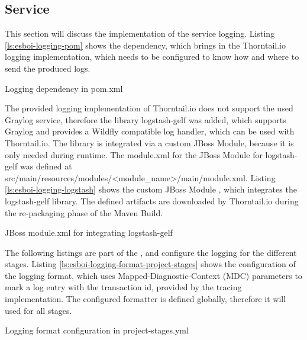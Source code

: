 \subsection{Service}
\label{sec:esbi-logging-service}
This section will discuss the implementation of the service logging. Listing \vref{ls:esboi-logging-pom} shows the dependency, which brings in the Thorntail.io logging implementation, which needs to be configured to know how and where to send the produced logs.

\begin{listing}[h]
	\caption{Logging dependency in pom.xml}
	\label{ls:esboi-logging-pom}
\end{listing}

The provided logging implementation of Thorntail.io does not support the used Graylog service, therefore the library logstash-gelf was added, which supports Graylog and provides a Wildfly compatible log handler, which can be used with Thorntail.io. The library is integrated via a custom JBoss Module, because it is only needed during runtime. The module.xml for the JBoss Module for logstash-gelf was defined at src/main/resources/modules/<module\_name>/main/module.xml. Listing \vref{ls:esboi-logging-logstash} shows the custom JBoss Module , which integrates the logstash-gelf library. The defined artifacts are downloaded by Thorntail.io during the re-packaging phase of the Maven Build\cite{LogstashGelf2018}.
\newpage

\begin{listing}[h]
	\caption{JBoss module.xml for integrating logstash-gelf}
	\label{ls:esboi-logging-logstash}
\end{listing}

The following listings are part of the , and configure the logging for the different stages. Listing \vref{ls:esboi-logging-format-project-stages} shows the configuration of the logging format, which uses Mapped-Diagnostic-Context (MDC) parameters to mark a log entry with the transaction id, provided by the tracing implementation. The configured formatter is defined globally, therefore it will used for all stages.

\begin{listing}[h]
	\caption{Logging format configuration in project-stages.yml}
	\label{ls:esboi-logging-format-project-stages}
\end{listing}


